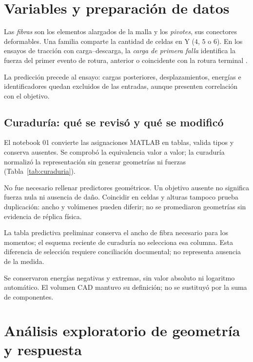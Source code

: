 \section{Variables y preparación de datos}
\label{sec:datos}

Las \emph{fibras} son los elementos alargados de la malla y los \emph{pivotes}, sus conectores deformables. Una familia comparte la cantidad de celdas en Y ($4$, $5$ o $6$). En los ensayos de tracción con carga--descarga, la \emph{carga de primera falla} identifica la fuerza del primer evento de rotura, anterior o coincidente con la rotura terminal \cite{venditti2025}.



La predicción precede al ensayo: cargas posteriores, desplazamientos, energías e identificadores quedan excluidos de las entradas, aunque presenten correlación con el objetivo.

\subsection{Curaduría: qué se revisó y qué se modificó}
El notebook 01 convierte las asignaciones MATLAB en tablas, valida tipos y conserva ausentes. Se comprobó la equivalencia valor a valor; la curaduría normalizó la representación sin generar geometrías ni fuerzas (Tabla~\ref{tab:curaduria}).



No fue necesario rellenar predictores geométricos. Un objetivo ausente no significa fuerza nula ni ausencia de daño. Coincidir en celdas y alturas tampoco prueba duplicación: ancho y volúmenes pueden diferir; no se promediaron geometrías sin evidencia de réplica física.

La tabla predictiva preliminar conserva el ancho de fibra necesario para los momentos; el esquema reciente de curaduría no selecciona esa columna. Esta diferencia de selección requiere conciliación documental; no representa ausencia de la medida.

Se conservaron energías negativas y extremas, sin valor absoluto ni logaritmo automático. El volumen CAD mantuvo su definición; no se sustituyó por la suma de componentes.

\section{Análisis exploratorio de geometría y respuesta}
\label{sec:eda}

